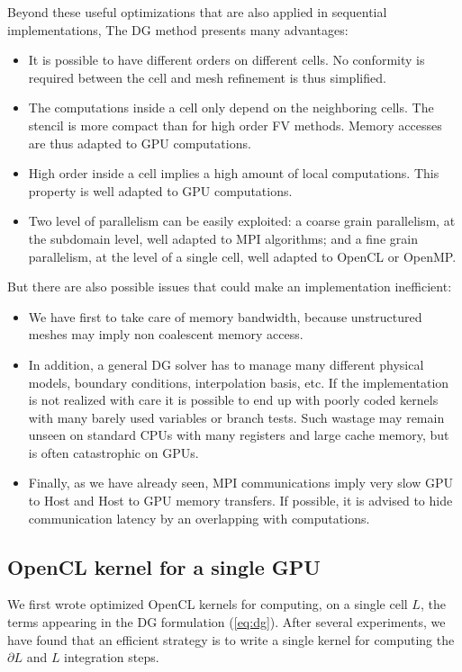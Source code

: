 \documentclass[12pt]{amsart}
\begin{document}
Beyond these useful optimizations that are also applied in sequential implementations, The DG method presents many advantages:

\begin{itemize}
\item It is possible to have different orders on different cells. No conformity is required between the cell and mesh refinement is thus simplified.
\item The computations inside a cell only depend on the neighboring cells. The stencil is more compact than for high order FV methods. Memory accesses are thus adapted to GPU computations.
\item High order inside a cell implies a high amount of local computations. This property is well adapted to GPU computations.
\item Two level of parallelism can be easily exploited: a coarse grain parallelism, at the subdomain level, well adapted to MPI algorithms; and a fine grain parallelism, at the level of a single cell, well adapted to OpenCL or OpenMP.
\end{itemize}

But there are also possible issues that could make an implementation inefficient:
\begin{itemize}
\item  We have first to take care of memory bandwidth, because unstructured meshes may imply non coalescent memory access.
\item In addition, a general DG solver has to manage many different physical models, boundary conditions, interpolation basis, etc. If the implementation is not realized with care it is possible to end up with poorly coded kernels with many barely used variables or branch tests. Such wastage may remain unseen on standard CPUs with many registers  and large cache memory, but is often catastrophic on GPUs.
\item Finally, as we have already seen, MPI communications imply very slow GPU to Host and Host to GPU memory transfers. If possible, it is advised to hide communication latency by an overlapping with computations.
\end{itemize}

\subsection{OpenCL kernel for a single GPU}
We first wrote optimized OpenCL kernels for computing, on a single cell $L$, the terms appearing in the DG formulation (\ref{eq:dg}).
After several experiments, we have found that an efficient strategy is to write
a single kernel for computing the $\partial L$ and $L$ integration steps.
\end{document}
